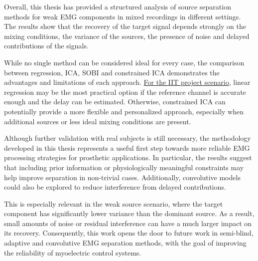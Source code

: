 Overall, this thesis has provided a structured analysis of source separation methods
for weak EMG components in mixed recordings in different settings. The results
show that the recovery of the target signal depends strongly on the mixing
conditions, the variance of the sources, the presence of noise and delayed
contributions of the signals.

While no single method can be considered ideal for every case, the comparison
between regression, ICA, SOBI and constrained ICA demonstrates the advantages and
limitations of each approach. \uline{For the IIT project scenario}, linear regression may
be the most practical option if the reference channel is accurate enough and the
delay can be estimated. Otherwise, constrained ICA can potentially provide a more flexible
and personalized approach, especially when additional sources or less ideal mixing
conditions are present.

Although further validation with real subjects is still necessary, the methodology
developed in this thesis represents a useful first step towards more reliable EMG
processing strategies for prosthetic  applications. In particular, the
results suggest that including prior information or
physiologically meaningful constraints may help improve separation in non-trivial
cases. Additionally, convolutive models could also be explored to reduce interference from
delayed contributions.

This is especially relevant in the weak source scenario, where the target component
has significantly lower variance than the dominant source. As a result, small
amounts of noise or residual interference can have a much larger impact on its
recovery. Consequently, this work opens the door to future work in
semi-blind, adaptive and convolutive EMG separation methods, with the 
goal of improving the reliability of myoelectric control systems.